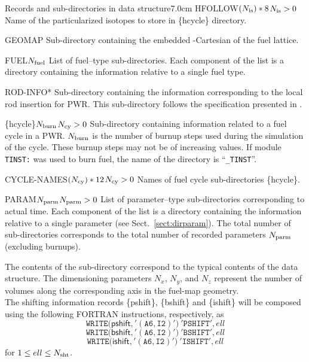 \begin{DescriptionEnregistrement}{Records and sub-directories
 in  data structure}{7.0cm}
\OptCharEnr
  {HFOLLOW}{$(N_{\rm is})*8$}{$N_{\rm is}>0$}
  {Name of the particularized isotopes to store in \{hcycle\} directory.}
   
\DirEnr
 {GEOMAP}
 {Sub-directory containing the embedded -Cartesian  of the fuel lattice.}

\DirlEnr
  {FUEL}{$N_{\rm fuel}$}
  {List of fuel--type sub-directories. Each component of the list is a directory containing
   the information relative to a single fuel type.}
   
\OptDirEnr
 {ROD-INFO}{*}
 {Sub-directory containing the information corresponding to the local rod insertion for PWR.
  This sub-directory follows the specification presented in .}
          
\OptDirlEnr
 {\{hcycle\}}{$N_{\rm burn}$}{$N_{\rm cy}> 0$}
 {Sub-directory containing information related to a fuel cycle in a PWR. $N_{\rm burn}$ is the number of burnup steps used during
 the simulation of the cycle. These burnup steps may not be of increasing values. If module {\tt TINST:} was used to burn fuel, the
 name of the  directory is ``{\tt \_TINST}''.}

\OptCharEnr
 {CYCLE-NAMES}{$(N_{\rm cy})*12$}{$N_{\rm cy}>0$}
 {Names of fuel cycle sub-directories \{hcycle\}.}

\OptDirlEnr
  {PARAM}{$N_{\rm parm}$}{$N_{\rm parm}>0$}
  {List of parameter--type sub-directories corresponding to actual time. Each component of the list is a directory
   containing the information relative to a single parameter (see Sect.~\ref{sect:dirparam}). The total number of sub-directories
   corresponds to the total number of recorded parameters $N_{\rm parm}$ (excluding  burnups).}

\end{DescriptionEnregistrement}

\noindent The contents of the  sub-directory correspond to the typical
contents of the  data structure.
The dimensioning parameters $N_x$, $N_y$, and $N_z$ represent the number
of volumes along the corresponding axis in the fuel-map geometry.\\

The shifting information records \{pshift\}, \{bshift\} and \{ishift\}
will be composed using the following FORTRAN instructions, respectively, as 
  \begin{displaymath}
    \mathtt{WRITE(}\mathsf{pshift}\mathtt{,'(A6,I2)')} \ 
   \mathtt{'PSHIFT'},ell
  \end{displaymath}
  \begin{displaymath}
    \mathtt{WRITE(}\mathsf{bshift}\mathtt{,'(A6,I2)')} \ 
   \mathtt{'BSHIFT'},ell
  \end{displaymath}
  \begin{displaymath}
    \mathtt{WRITE(}\mathsf{ishift}\mathtt{,'(A6,I2)')} \ 
   \mathtt{'ISHIFT'},ell
  \end{displaymath}
for $1\leq ell \leq N_{\rm sht}$. \\

